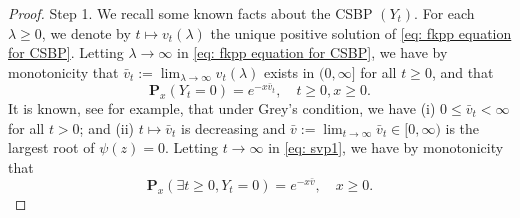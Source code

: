 \documentclass[12pt,a4paper]{amsart}
\theoremstyle{plain}
\theoremstyle{definition}
\numberwithin{equation}{section}
\begin{document}
\begin{proof}
    Step 1. We recall some known facts about the CSBP $(Y_t)$.
       For each $\lambda \geq 0$, we denote by $t\mapsto v_t(\lambda)$ the unique positive solution of \eqref{eq: fkpp equation for CSBP}.
    Letting $\lambda \to \infty$ in \eqref{eq: fkpp equation for CSBP}, we have by monotonicity that $\bar v_t:= \lim_{\lambda \to \infty}v_t(\lambda)$ exists in $(0,\infty]$ for all $t\geq 0$, and that
\begin{equation}
\label{eq: svp1}
    \mathbf P_x(Y_t = 0)=e^{-x\bar v_t}, \quad t\geq 0, x\ge 0.
\end{equation}
    It is known, see \cite[Theorems 3.5--3.8]{Li2011Measure-valued} for example, that under Grey's condition, 
we have (i) $0\leq \bar v_t < \infty$ for all $t>0$; and (ii) $t\mapsto \bar v_t$ is decreasing and $\bar v:= \lim_{t\to \infty} \bar v_t \in [0,\infty)$ is the largest root of $\psi(z) = 0$.
    Letting $t \to \infty$ in \eqref{eq: svp1}, we have by monotonicity that
\[
    \mathbf P_x(\exists t \geq 0, Y_t = 0)
    = e^{-x\bar v}, \quad x\geq 0.
\]


\end{proof}
\end{document}
